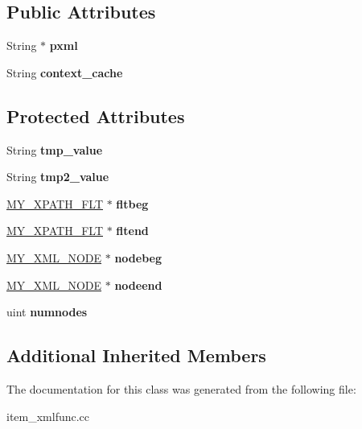 \subsection*{Public Attributes}
\begin{DoxyCompactItemize}
\item 
\mbox{\label{classItem__nodeset__func_af37074066d3af937a07ff96403269d47}} 
String $\ast$ {\bfseries pxml}
\item 
\mbox{\label{classItem__nodeset__func_a57d8823b2b5ea7be93c7da3c628b6646}} 
String {\bfseries context\+\_\+cache}
\end{DoxyCompactItemize}
\subsection*{Protected Attributes}
\begin{DoxyCompactItemize}
\item 
\mbox{\label{classItem__nodeset__func_a6fe361a13188c89077902d1c9284c5be}} 
String {\bfseries tmp\+\_\+value}
\item 
\mbox{\label{classItem__nodeset__func_ab40193d593bc066e05e3a5f73eb8659e}} 
String {\bfseries tmp2\+\_\+value}
\item 
\mbox{\label{classItem__nodeset__func_ae0f3255093f60cc7f6d820eac9cde271}} 
\mbox{\hyperlink{structmy__xpath__flt__st}{M\+Y\+\_\+\+X\+P\+A\+T\+H\+\_\+\+F\+LT}} $\ast$ {\bfseries fltbeg}
\item 
\mbox{\label{classItem__nodeset__func_a13d879a6cf1f7931642e4fd0db0a790f}} 
\mbox{\hyperlink{structmy__xpath__flt__st}{M\+Y\+\_\+\+X\+P\+A\+T\+H\+\_\+\+F\+LT}} $\ast$ {\bfseries fltend}
\item 
\mbox{\label{classItem__nodeset__func_a97b07e54656ba57adc70e2cdad2d046a}} 
\mbox{\hyperlink{structmy__xml__node__st}{M\+Y\+\_\+\+X\+M\+L\+\_\+\+N\+O\+DE}} $\ast$ {\bfseries nodebeg}
\item 
\mbox{\label{classItem__nodeset__func_affc56c598c880f3ec51563bc66ed4342}} 
\mbox{\hyperlink{structmy__xml__node__st}{M\+Y\+\_\+\+X\+M\+L\+\_\+\+N\+O\+DE}} $\ast$ {\bfseries nodeend}
\item 
\mbox{\label{classItem__nodeset__func_a975f6b6aa05df6aefe92768d8033b7ed}} 
uint {\bfseries numnodes}
\end{DoxyCompactItemize}
\subsection*{Additional Inherited Members}


The documentation for this class was generated from the following file\+:\begin{DoxyCompactItemize}
\item 
item\+\_\+xmlfunc.\+cc\end{DoxyCompactItemize}
